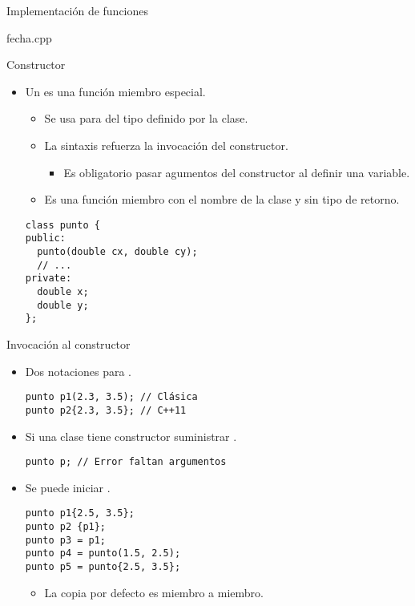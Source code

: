 \begin{frame}[t]{Implementación de funciones}
\begin{block}{fecha.cpp}

\end{block}
\end{frame}

\begin{frame}[t,fragile]{Constructor}
\begin{itemize}
  \item Un  es una función miembro especial.
    \begin{itemize}
      \item Se usa para  del tipo definido por la clase.
      \item La sintaxis refuerza la invocación del constructor.
        \begin{itemize}
          \item Es obligatorio pasar agumentos del constructor al definir una variable.
        \end{itemize}
      \item Es una función miembro con el nombre de la clase y sin tipo de retorno.
    \end{itemize}
\begin{lstlisting}
class punto {
public:
  punto(double cx, double cy);
  // ...
private:
  double x;
  double y;
};
\end{lstlisting}
\end{itemize}
\end{frame}

\begin{frame}[t,fragile]{Invocación al constructor}
\begin{itemize}
  \item Dos notaciones para .
\begin{lstlisting}
punto p1(2.3, 3.5); // Clásica
punto p2{2.3, 3.5}; // C++11
\end{lstlisting}

  \item Si una clase tiene constructor  suministrar 
        .
\begin{lstlisting}
punto p; // Error faltan argumentos
\end{lstlisting}

  \item Se puede iniciar .
\begin{lstlisting}
punto p1{2.5, 3.5};
punto p2 {p1};
punto p3 = p1;
punto p4 = punto(1.5, 2.5);
punto p5 = punto{2.5, 3.5};
\end{lstlisting}
    \begin{itemize}
      \item La copia por defecto es miembro a miembro.
    \end{itemize}
\end{itemize}
\end{frame}

